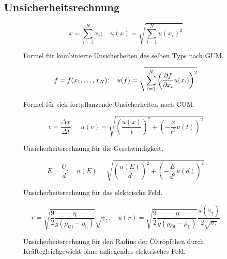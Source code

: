 \subsection{Unsicherheitsrechnung}\label{VGuD}

\begin{figure}[h]
	\begin{equation*}
		x = \sum_{i=1}^{N} x_i
		;\quad
		u(x) = \sqrt{\sum_{i = 1}^{N} u(x_i)^2}
	\end{equation*}
	\caption{Formel für kombinierte Unsicherheiten des selben Typs nach GUM.}
	\label{eq:GUM_combine}
\end{figure}

\begin{figure}[h]
	\begin{equation*}
		f = f(x_1, \dots , x_N)
		;\quad
		u(f) = \sqrt{\sum_{i = 1}^{N}\left(\pdv{f}{x_i} u(x_i)\right) ^2}
	\end{equation*}
	\caption{Formel für sich fortpflanzende Unsicherheiten nach GUM.}
	\label{eq:GUM_formula}
\end{figure}

\begin{figure}[h]
	\begin{equation*}
		v = \frac{\Delta x}{\Delta t}
		;\quad
		u(v) = \sqrt{\left( \frac{u(x)}{t} \right)^2 + \left( -\frac{x}{t^2} u(t) \right)^2}
	\end{equation*}
	\caption{Unsicherheitsrechnung für die Geschwindigkeit.}
	\label{eq:unc_v}
\end{figure}

\begin{figure}[h]
	\begin{equation*}
		E = \frac{U}{d}
		;\quad
		u(E) = \sqrt{\left( \frac{u(E)}{d} \right)^2 + \left( -\frac{E}{d^2} u(d) \right)^2}
	\end{equation*}
	\caption{Unsicherheitsrechnung für das elektrische Feld.}
	\label{eq:unc_E}
\end{figure}

\begin{figure}[h]
	\begin{equation*}
		r = \sqrt{\frac{9}{2} \frac{\eta}{g(\rho_\text{Öl}-\rho_\text{L})}} \sqrt{v_\uparrow}
		;\quad
		u(r) = \sqrt{\frac{9}{2} \frac{\eta}{g(\rho_\text{Öl}-\rho_\text{L})}} \frac{u(v_\uparrow)}{2\sqrt{v_\uparrow}}
	\end{equation*}
	\caption{Unsicherheitsrechnung für den Radius der Öltröpfchen durch Kräftegleichgewicht ohne anliegendes elektrisches Feld.}
	\label{eq:unc_r}
\end{figure}

